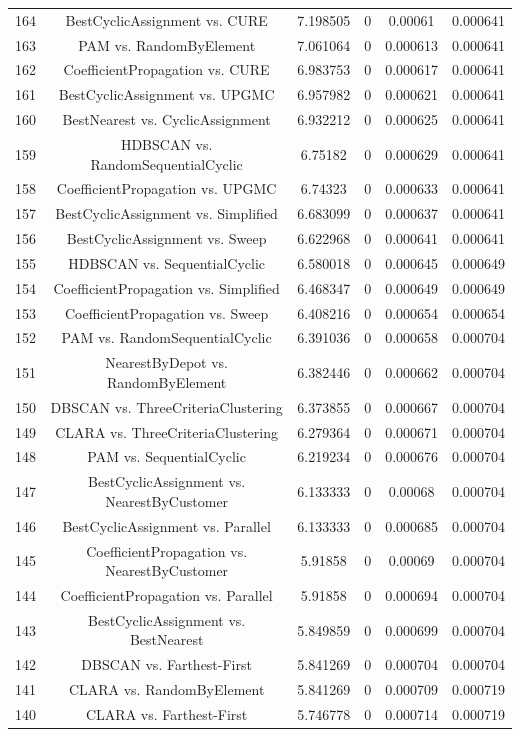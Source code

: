 \documentclass[a4paper,10pt]{article}
\begin{document}
\begin{landscape}
\begin{table}[!htp]
\begin{tabular}{cccccc}
164&BestCyclicAssignment vs. CURE&7.198505&0&0.00061&0.000641\\
163&PAM vs. RandomByElement&7.061064&0&0.000613&0.000641\\
162&CoefficientPropagation vs. CURE&6.983753&0&0.000617&0.000641\\
161&BestCyclicAssignment vs. UPGMC&6.957982&0&0.000621&0.000641\\
160&BestNearest vs. CyclicAssignment&6.932212&0&0.000625&0.000641\\
159&HDBSCAN vs. RandomSequentialCyclic&6.75182&0&0.000629&0.000641\\
158&CoefficientPropagation vs. UPGMC&6.74323&0&0.000633&0.000641\\
157&BestCyclicAssignment vs. Simplified&6.683099&0&0.000637&0.000641\\
156&BestCyclicAssignment vs. Sweep&6.622968&0&0.000641&0.000641\\
155&HDBSCAN vs. SequentialCyclic&6.580018&0&0.000645&0.000649\\
154&CoefficientPropagation vs. Simplified&6.468347&0&0.000649&0.000649\\
153&CoefficientPropagation vs. Sweep&6.408216&0&0.000654&0.000654\\
152&PAM vs. RandomSequentialCyclic&6.391036&0&0.000658&0.000704\\
151&NearestByDepot vs. RandomByElement&6.382446&0&0.000662&0.000704\\
150&DBSCAN vs. ThreeCriteriaClustering&6.373855&0&0.000667&0.000704\\
149&CLARA vs. ThreeCriteriaClustering&6.279364&0&0.000671&0.000704\\
148&PAM vs. SequentialCyclic&6.219234&0&0.000676&0.000704\\
147&BestCyclicAssignment vs. NearestByCustomer&6.133333&0&0.00068&0.000704\\
146&BestCyclicAssignment vs. Parallel&6.133333&0&0.000685&0.000704\\
145&CoefficientPropagation vs. NearestByCustomer&5.91858&0&0.00069&0.000704\\
144&CoefficientPropagation vs. Parallel&5.91858&0&0.000694&0.000704\\
143&BestCyclicAssignment vs. BestNearest&5.849859&0&0.000699&0.000704\\
142&DBSCAN vs. Farthest-First&5.841269&0&0.000704&0.000704\\
141&CLARA vs. RandomByElement&5.841269&0&0.000709&0.000719\\
140&CLARA vs. Farthest-First&5.746778&0&0.000714&0.000719\\

\end{tabular}
\end{table}
\end{landscape}
\end{document}
